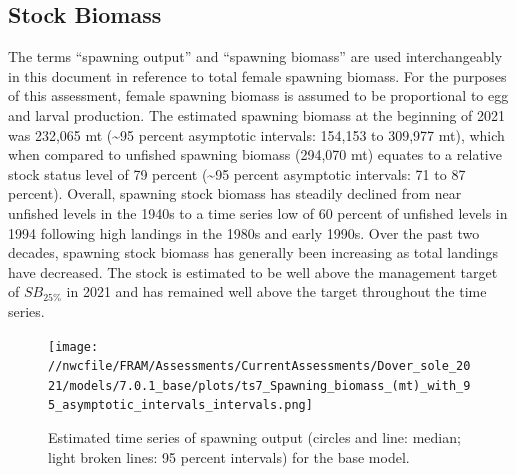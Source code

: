 \documentclass[11pt,
  english,
  a4paper,
]{article}
\begin{document}
\leavevmode\tagmcend\tagstructend\par


\hypertarget{stock-biomass}{%
\subsection*{Stock Biomass}\label{stock-biomass}}

\leavevmode\tagmcend\tagstructend


The terms ``spawning output'' and ``spawning biomass'' are used interchangeably in this document in reference to total female spawning biomass. For the purposes of this assessment, female spawning biomass is assumed to be proportional to egg and larval production. The estimated spawning biomass at the beginning of 2021 was 232,065 mt (\textasciitilde95 percent asymptotic intervals: 154,153 to 309,977 mt), which when compared to unfished spawning biomass (294,070 mt) equates to a relative stock status level of 79 percent (\textasciitilde95 percent asymptotic intervals: 71 to 87 percent). Overall, spawning stock biomass has steadily declined from near unfished levels in the 1940s to a time series low of 60 percent of unfished levels in 1994 following high landings in the 1980s and early 1990s. Over the past two decades, spawning stock biomass has generally been increasing as total landings have decreased. The stock is estimated to be well above the management target of {\(SB_{25\%}\)\leavevmode\tagmcend\tagstructend} in 2021 and has remained well above the target throughout the time series.

\leavevmode\tagmcend\tagstructend\par




\begin{figure}
\centering
\texttt{[image: //nwcfile/FRAM/Assessments/CurrentAssessments/Dover\_sole\_2021/models/7.0.1\_base/plots/ts7\_Spawning\_biomass\_(mt)\_with\_95\_asymptotic\_intervals\_intervals.png]}
\caption{Estimated time series of spawning output (circles and line: median; light broken lines: 95 percent intervals) for the base model.\label{fig:es-ssb}}
\end{figure}
\end{document}
